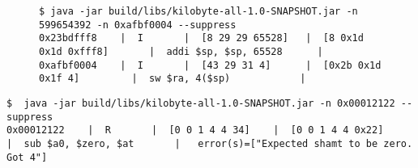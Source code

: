 \begin{landscape}
\begin{figure}
\begin{lstlisting}[style=plain,
    basicstyle=\small,
    caption=Parsing numbers from input arguments using the \tt{-n} flag,
    label=listing:parsing-numbers-from-input-arguments]
$ java -jar build/libs/kilobyte-all-1.0-SNAPSHOT.jar -n 599654392 -n 0xafbf0004 --suppress
0x23bdfff8    |  I       |  [8 29 29 65528]   |  [8 0x1d 0x1d 0xfff8]       |  addi $sp, $sp, 65528      |  
0xafbf0004    |  I       |  [43 29 31 4]      |  [0x2b 0x1d 0x1f 4]         |  sw $ra, 4($sp)            |
\end{lstlisting}
\end{figure}

\begin{lstlisting}[basicstyle=\small,
    style=plain,
    caption=Error print-outs for partially valid instructions,
    label=listing:partially-valid-instructions,
  backgroundcolor=\color{mintedbackground}]
$  java -jar build/libs/kilobyte-all-1.0-SNAPSHOT.jar -n 0x00012122 --suppress
0x00012122    |  R       |  [0 0 1 4 4 34]    |  [0 0 1 4 4 0x22]           |  sub $a0, $zero, $at       |   error(s)=["Expected shamt to be zero. Got 4"]
\end{lstlisting}
\end{landscape}
